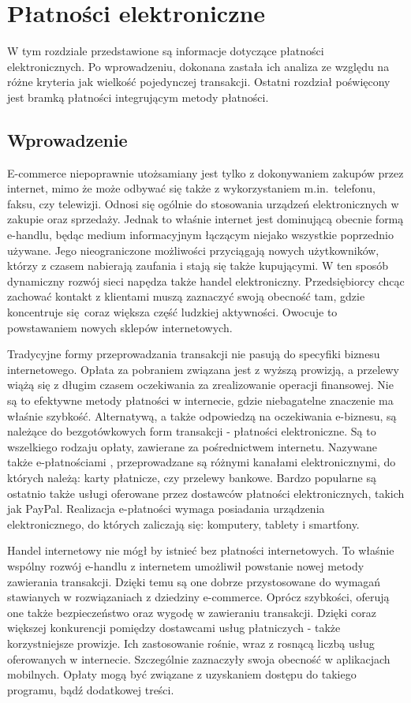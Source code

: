 \section{Płatności elektroniczne}
W tym rozdziale przedstawione są informacje dotyczące płatności elektronicznych. Po wprowadzeniu, dokonana zastała ich analiza ze względu na różne kryteria jak wielkość pojedynczej transakcji. Ostatni rozdział poświęcony jest bramką płatności integrującym metody płatności.

\subsection{Wprowadzenie}

E-commerce niepoprawnie utożsamiany jest tylko z dokonywaniem zakupów przez internet, mimo że może odbywać się także z wykorzystaniem m.in.~telefonu, faksu, czy telewizji. Odnosi się ogólnie do stosowania urządzeń elektronicznych w zakupie oraz sprzedaży. Jednak to właśnie internet jest dominującą obecnie formą e-handlu, będąc medium informacyjnym łączącym niejako wszystkie poprzednio używane. Jego nieograniczone możliwości przyciągają nowych użytkowników, którzy z czasem nabierają zaufania i stają się także kupującymi. W ten sposób dynamiczny rozwój sieci napędza także handel elektroniczny. Przedsiębiorcy chcąc zachować kontakt z klientami muszą zaznaczyć swoją obecność tam, gdzie koncentruje się coraz większa część ludzkiej aktywności. Owocuje to powstawaniem nowych sklepów internetowych.

Tradycyjne formy przeprowadzania transakcji nie pasują do specyfiki biznesu internetowego. Opłata za pobraniem związana jest z wyższą prowizją, a przelewy wiążą się z długim czasem oczekiwania za zrealizowanie operacji finansowej. Nie są to efektywne metody płatności w internecie, gdzie niebagatelne znaczenie ma właśnie szybkość. Alternatywą, a także odpowiedzą na oczekiwania e-biznesu, są należące do bezgotówkowych form transakcji - płatności elektroniczne. Są to wszelkiego rodzaju opłaty, zawierane za pośrednictwem internetu. Nazywane także e-płatnościami \cite{elektroniczne_metody_platnosci}, przeprowadzane są różnymi kanałami elektronicznymi, do których należą: karty płatnicze, czy przelewy bankowe. Bardzo popularne są ostatnio także usługi oferowane przez dostawców płatności elektronicznych, takich jak PayPal. Realizacja e-płatności wymaga posiadania urządzenia elektronicznego, do których zaliczają się: komputery, tablety i smartfony. 

Handel internetowy nie mógł by istnieć bez płatności internetowych. To właśnie wspólny rozwój e-handlu z internetem umożliwił powstanie nowej metody zawierania transakcji. Dzięki temu są one dobrze przystosowane do wymagań stawianych w rozwiązaniach z dziedziny e-commerce. Oprócz szybkości, oferują one także bezpieczeństwo oraz wygodę w zawieraniu transakcji. Dzięki coraz większej konkurencji pomiędzy dostawcami usług płatniczych - także korzystniejsze prowizje. Ich zastosowanie rośnie, wraz z rosnącą liczbą usług oferowanych w internecie. Szczególnie zaznaczyły swoja obecność w aplikacjach mobilnych. Opłaty mogą być związane z uzyskaniem dostępu do takiego programu, bądź dodatkowej treści.

